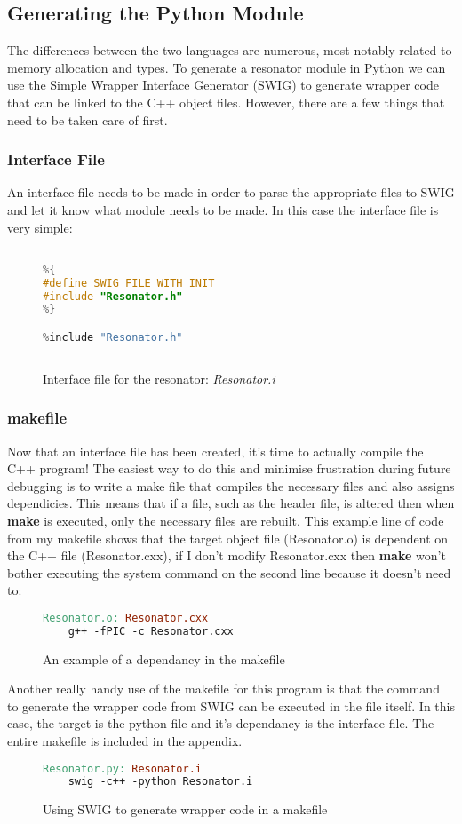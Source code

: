 \documentclass{article}
\begin{document}
\subsection{Generating the Python Module}
The differences between the two languages are numerous, most notably related to memory allocation and types. To generate a resonator module in Python we can use the Simple Wrapper Interface Generator (SWIG) to generate wrapper code that can be linked to the C++ object files. However, there are a few things that need to be taken care of first. 
\subsubsection{Interface File}
An interface file needs to be made in order to parse the appropriate files to SWIG and let it know what module needs to be made. In this case the interface file is very simple:
\begin{figure}[H]
	\begin{lstlisting}[language=c]
%module Resonator

%{
#define SWIG_FILE_WITH_INIT
#include "Resonator.h"
%}

%include "Resonator.h"
 
	\end{lstlisting}
	\caption{Interface file for the resonator: \textit{Resonator.i}}
\end{figure} 
\subsubsection{makefile}
Now that an interface file has been created, it's time to actually compile the C++ program! The easiest way to do this and minimise frustration during future debugging is to write a make file that compiles the necessary files and also assigns dependicies. This means that if a file, such as the header file, is altered then when \textbf{make} is executed, only the necessary files are rebuilt. This example line of code from my makefile shows that the target object file (Resonator.o) is dependent on the C++ file (Resonator.cxx), if I don't modify Resonator.cxx then \textbf{make} won't bother executing the system command on the second line because it doesn't need to:
\begin{figure}[H]
\begin{lstlisting}[language=make]
Resonator.o: Resonator.cxx
	g++ -fPIC -c Resonator.cxx 
\end{lstlisting}
\caption{An example of a dependancy in the makefile}
\end{figure}
Another really handy use of the makefile for this program is that the command to generate the wrapper code from SWIG can be executed in the file itself. In this case, the target is the python file and it's dependancy is the interface file. The entire makefile is included in the appendix.
\begin{figure}[H]
	\begin{lstlisting}[language=make]
Resonator.py: Resonator.i
	swig -c++ -python Resonator.i 
	\end{lstlisting}
	\caption{Using SWIG to generate wrapper code in a makefile}
\end{figure}
\end{document}

